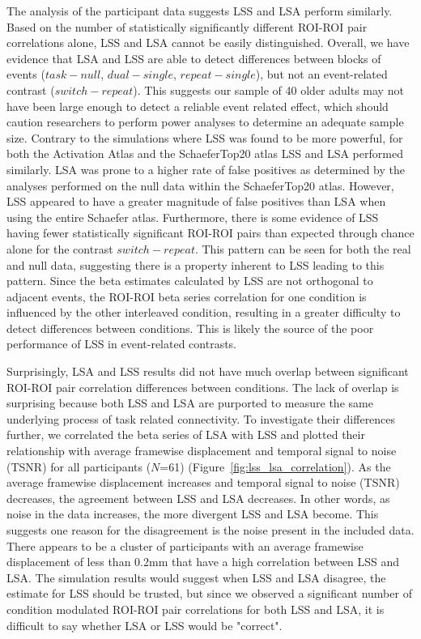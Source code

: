 \documentclass[phd,appendix,figures]{uithesis}
\begin{document}
The analysis of the participant data suggests LSS and LSA perform similarly.
Based on the number of statistically significantly different ROI-ROI pair correlations alone,
LSS and LSA cannot be easily distinguished.
Overall, we have evidence that LSA and LSS are able to detect differences between
blocks of events ($task - null$, $dual - single$, $repeat - single$), but not an event-related contrast ($switch - repeat$).
This suggests our sample of 40 older adults may not have been large enough to detect a reliable event related effect,
which should caution researchers to perform power analyses to determine an adequate sample size.
Contrary to the simulations where LSS was found to be more powerful,
for both the Activation Atlas and the SchaeferTop20 atlas LSS and LSA performed similarly.
LSA was prone to a higher rate of false positives as determined by the analyses performed on the null data within the SchaeferTop20 atlas.
However, LSS appeared to have a greater magnitude of false positives than LSA when using the entire Schaefer atlas.
Furthermore, there is some evidence of LSS having fewer statistically significant ROI-ROI pairs than expected through chance alone
for the contrast $switch - repeat$.
This pattern can be seen for both the real and null data, suggesting there is a property inherent to LSS
leading to this pattern.
Since the beta estimates calculated by LSS are not orthogonal to adjacent events,
the ROI-ROI beta series correlation for one condition is influenced by the other interleaved condition,
resulting in a greater difficulty to detect differences between conditions.
This is likely the source of the poor performance of LSS in event-related contrasts.

Surprisingly, LSA and LSS results did not have much overlap between significant
ROI-ROI pair correlation differences between conditions.
The lack of overlap is surprising because both LSS and LSA are purported to
measure the same underlying process of task related connectivity.
To investigate their differences further, we correlated the beta series of LSA with LSS and plotted their relationship with
average framewise displacement and temporal signal to noise (TSNR) for all participants ($N$=61) (Figure~\ref{fig:lss_lsa_correlation}).
As the average framewise displacement increases and temporal signal to noise (TSNR)
decreases, the agreement between LSS and LSA decreases.
In other words, as noise in the data increases, the more divergent LSS and LSA become.
This suggests one reason for the disagreement is the noise present in the included
data.
There appears to be a cluster of participants with an average framewise displacement of
less than 0.2mm that have a high correlation between LSS and LSA.
The simulation results would suggest when LSS and LSA disagree, the estimate for LSS should be
trusted, but since we observed a significant number of condition modulated ROI-ROI pair correlations for both
LSS and LSA, it is difficult to say whether LSA or LSS would be "correct".
\end{document}
